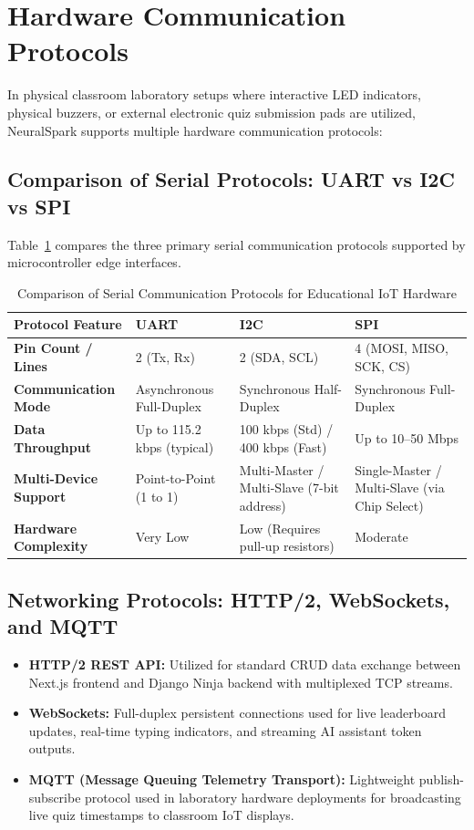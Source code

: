 \section{Hardware Communication Protocols}
In physical classroom laboratory setups where interactive LED indicators, physical buzzers, or external electronic quiz submission pads are utilized, NeuralSpark supports multiple hardware communication protocols:

\subsection{Comparison of Serial Protocols: UART vs I2C vs SPI}
Table~\ref{tab:serial_protocols_comparison} compares the three primary serial communication protocols supported by microcontroller edge interfaces.

\begin{table}[H]
\centering
\caption{Comparison of Serial Communication Protocols for Educational IoT Hardware}
\label{tab:serial_protocols_comparison}
\small
\begin{tabularx}{\textwidth}{p{3.2cm} p{3.0cm} p{3.5cm} X}
\toprule
\textbf{Protocol Feature} & \textbf{UART} & \textbf{I2C} & \textbf{SPI} \\
\midrule
\textbf{Pin Count / Lines} & 2 (Tx, Rx) & 2 (SDA, SCL) & 4 (MOSI, MISO, SCK, CS) \\
\textbf{Communication Mode} & Asynchronous Full-Duplex & Synchronous Half-Duplex & Synchronous Full-Duplex \\
\textbf{Data Throughput} & Up to 115.2 kbps (typical) & 100 kbps (Std) / 400 kbps (Fast) & Up to 10--50 Mbps \\
\textbf{Multi-Device Support} & Point-to-Point (1 to 1) & Multi-Master / Multi-Slave (7-bit address) & Single-Master / Multi-Slave (via Chip Select) \\
\textbf{Hardware Complexity} & Very Low & Low (Requires pull-up resistors) & Moderate \\
\bottomrule
\end{tabularx}
\end{table}

\subsection{Networking Protocols: HTTP/2, WebSockets, and MQTT}
\begin{itemize}[leftmargin=*]
    \item \textbf{HTTP/2 REST API:} Utilized for standard CRUD data exchange between Next.js frontend and Django Ninja backend with multiplexed TCP streams.
    \item \textbf{WebSockets:} Full-duplex persistent connections used for live leaderboard updates, real-time typing indicators, and streaming AI assistant token outputs.
    \item \textbf{MQTT (Message Queuing Telemetry Transport):} Lightweight publish-subscribe protocol used in laboratory hardware deployments for broadcasting live quiz timestamps to classroom IoT displays.
\end{itemize}

